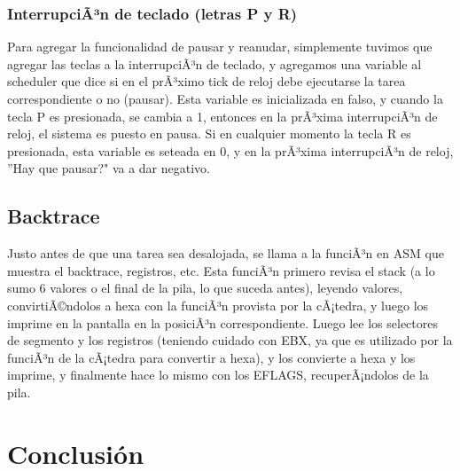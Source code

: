 \documentclass[10pt, a4paper]{article}
\begin{document}
\subsubsection*{InterrupciÃ³n de teclado (letras P y R)}
Para agregar la funcionalidad de pausar y reanudar, simplemente tuvimos que agregar las teclas a la interrupciÃ³n de teclado, y agregamos una variable al scheduler que dice si en el prÃ³ximo tick de reloj debe ejecutarse la tarea correspondiente o no (pausar). Esta variable es inicializada en falso, y cuando la tecla P es presionada, se cambia a 1, entonces en la prÃ³xima interrupciÃ³n de reloj, el sistema es puesto en pausa. Si en cualquier momento la tecla R es presionada, esta variable es seteada en 0, y en la prÃ³xima interrupciÃ³n de reloj, ''Hay que pausar?" va a dar negativo.

\subsection{Backtrace}
Justo antes de que una tarea sea desalojada, se llama a la funciÃ³n en ASM que muestra el backtrace, registros, etc.
Esta funciÃ³n primero revisa el stack (a lo sumo 6 valores o el final de la pila, lo que suceda antes), leyendo valores, convirtiÃ©ndolos a hexa con la funciÃ³n provista por la cÃ¡tedra, y luego los imprime en la pantalla en la posiciÃ³n correspondiente. Luego lee los selectores de segmento y los registros (teniendo cuidado con EBX, ya que es utilizado por la funciÃ³n de la cÃ¡tedra para convertir a hexa), y los convierte a hexa y los imprime, y finalmente hace lo mismo con los EFLAGS, recuperÃ¡ndolos de la pila.



\section{Conclusi\'on}
\end{document}
